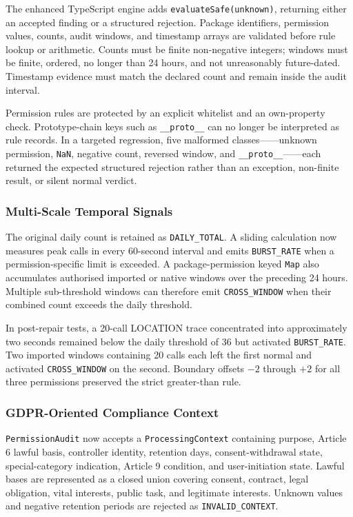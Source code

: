 The enhanced TypeScript engine adds \texttt{evaluateSafe(unknown)}, returning either an accepted finding or a structured rejection. Package identifiers, permission values, counts, audit windows, and timestamp arrays are validated before rule lookup or arithmetic. Counts must be finite non-negative integers; windows must be finite, ordered, no longer than 24 hours, and not unreasonably future-dated. Timestamp evidence must match the declared count and remain inside the audit interval.

Permission rules are protected by an explicit whitelist and an own-property check. Prototype-chain keys such as \texttt{\_\_proto\_\_} can no longer be interpreted as rule records. In a targeted regression, five malformed classes——unknown permission, \texttt{NaN}, negative count, reversed window, and \texttt{\_\_proto\_\_}——each returned the expected structured rejection rather than an exception, non-finite result, or silent normal verdict.

\subsubsection{Multi-Scale Temporal Signals}

The original daily count is retained as \texttt{DAILY\_TOTAL}. A sliding calculation now measures peak calls in every 60-second interval and emits \texttt{BURST\_RATE} when a permission-specific limit is exceeded. A package-permission keyed \texttt{Map} also accumulates authorised imported or native windows over the preceding 24 hours. Multiple sub-threshold windows can therefore emit \texttt{CROSS\_WINDOW} when their combined count exceeds the daily threshold.

In post-repair tests, a 20-call LOCATION trace concentrated into approximately two seconds remained below the daily threshold of 36 but activated \texttt{BURST\_RATE}. Two imported windows containing 20 calls each left the first normal and activated \texttt{CROSS\_WINDOW} on the second. Boundary offsets \(-2\) through \(+2\) for all three permissions preserved the strict greater-than rule.

\subsubsection{GDPR-Oriented Compliance Context}

\texttt{PermissionAudit} now accepts a \texttt{ProcessingContext} containing purpose, Article 6 lawful basis, controller identity, retention days, consent-withdrawal state, special-category indication, Article 9 condition, and user-initiation state. Lawful bases are represented as a closed union covering consent, contract, legal obligation, vital interests, public task, and legitimate interests. Unknown values and negative retention periods are rejected as \texttt{INVALID\_CONTEXT}.

